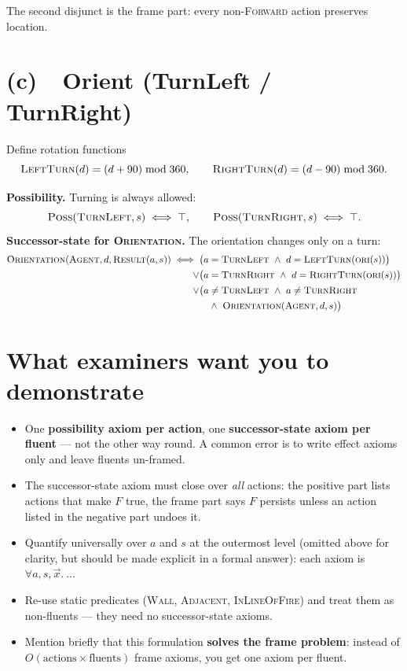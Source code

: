 \documentclass[11pt,a4paper]{article}
\newcommand{\pred}[1]{\textsc{#1}}
\newcommand{\Result}{\pred{Result}}
\newcommand{\Poss}{\pred{Poss}}
\begin{document}
The second disjunct is the frame part: every non-\pred{Forward} action preserves location.

\section*{(c)\ \ Orient (TurnLeft / TurnRight)}

Define rotation functions
\[
  \pred{LeftTurn}(d) = (d + 90) \bmod 360, \qquad \pred{RightTurn}(d) = (d - 90) \bmod 360.
\]

\begin{tcolorbox}[colback=gray!5,colframe=gray!50!black]
\textbf{Possibility.} Turning is always allowed:
\[
  \Poss(\pred{TurnLeft}, s) \iff \top, \qquad \Poss(\pred{TurnRight}, s) \iff \top.
\]
\textbf{Successor-state for \pred{Orientation}.} The orientation changes only on a turn:
\begin{align*}
\pred{Orientation}(\pred{Agent}, d, \Result(a, s)) \iff{}
& \big(a = \pred{TurnLeft} \ \wedge\ d = \pred{LeftTurn}(\pred{ori}(s))\big)\\
\vee{}& \big(a = \pred{TurnRight} \ \wedge\ d = \pred{RightTurn}(\pred{ori}(s))\big)\\
\vee{}& \big(a \neq \pred{TurnLeft} \ \wedge\ a \neq \pred{TurnRight}\\
& \quad \wedge\ \pred{Orientation}(\pred{Agent}, d, s)\big)
\end{align*}
\end{tcolorbox}

\section*{What examiners want you to demonstrate}

\begin{itemize}[leftmargin=*,itemsep=2pt]
  \item One \textbf{possibility axiom per action}, one \textbf{successor-state axiom per fluent} --- not the other way round. A common error is to write effect axioms only and leave fluents un-framed.
  \item The successor-state axiom must close over \emph{all} actions: the positive part lists actions that make $F$ true, the frame part says $F$ persists unless an action listed in the negative part undoes it.
  \item Quantify universally over $a$ and $s$ at the outermost level (omitted above for clarity, but should be made explicit in a formal answer): each axiom is $\forall a,s,\vec{x}.\ \ldots$
  \item Re-use static predicates (\pred{Wall}, \pred{Adjacent}, \pred{InLineOfFire}) and treat them as non-fluents --- they need no successor-state axioms.
  \item Mention briefly that this formulation \textbf{solves the frame problem}: instead of $O(\text{actions} \times \text{fluents})$ frame axioms, you get one axiom per fluent.
\end{itemize}
\end{document}
